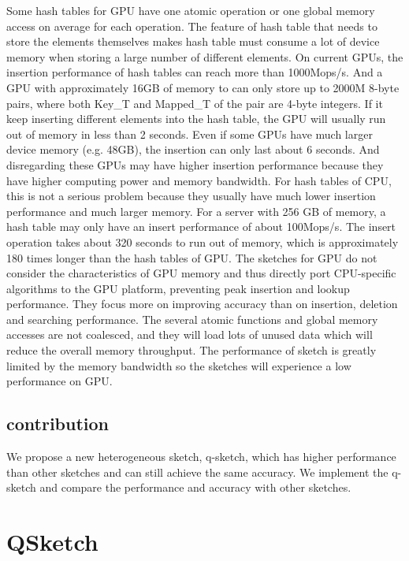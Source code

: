 \documentclass[conference]{IEEEtran}
\begin{document}
Some hash tables for GPU have one atomic operation or one global memory access on average for each operation. The feature of hash table that needs to store the elements themselves makes hash table must consume a lot of device memory when storing a large number of different elements. On current GPUs, the insertion performance of hash tables can reach more than 1000Mops/s. And a GPU with approximately 16GB of memory to can only store up to 2000M 8-byte pairs, where both Key\_T and Mapped\_T of the pair are 4-byte integers. If it keep inserting different elements into the hash table, the GPU will usually run out of memory in less than 2 seconds. Even if some GPUs have much larger device memory (e.g. 48GB), the insertion can only last about 6 seconds. And disregarding these GPUs may have higher insertion performance because they have higher computing power and memory bandwidth. For hash tables of CPU, this is not a serious problem because they usually have much lower insertion performance and much larger memory. For a server with 256 GB of memory, a hash table may only have an insert performance of about 100Mops/s. The insert operation takes about 320 seconds to run out of memory, which is approximately 180 times longer than the hash tables of GPU.
The sketches for GPU do not consider the characteristics of GPU memory and thus directly port CPU-specific algorithms to the GPU platform, preventing peak insertion and lookup performance. They focus more on improving accuracy than on insertion, deletion and searching performance. The several atomic functions and global memory accesses are not coalesced, and they will load lots of unused data which will reduce the overall memory throughput. The performance of sketch is greatly limited by the memory bandwidth so the sketches will experience a low performance on GPU.

\subsection{contribution}
We propose a new heterogeneous sketch, q-sketch, which has higher performance than other sketches and can still achieve the same accuracy. We implement the q-sketch and compare the performance and accuracy with other sketches.  
\section{QSketch}
\end{document}
